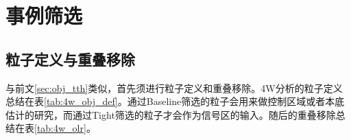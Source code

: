 \section{事例筛选}\label{sec:evtsel}


\subsection{粒子定义与重叠移除}\label{subsec:4w_obj_def}
与前文\ref{sec:obj_tth}类似，首先须进行粒子定义和重叠移除。4W分析的粒子定义总结在表\ref{tab:4w_obj_def}。通过Baseline筛选的粒子会用来做控制区域或者本底估计的研究，而通过Tight筛选的粒子才会作为信号区的输入。随后的重叠移除总结在表\ref{tab:4w_olr}。




